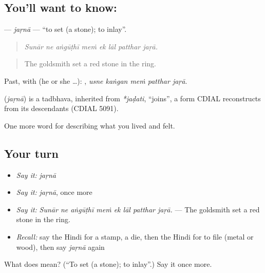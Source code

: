 \subsection*{You'll want to know: }
\textbf{} — \emph{jaṛnā} — \textquotedblleft{}to set (a stone); to inlay\textquotedblright{}.

\begin{quote}
       
\end{quote}

\begin{quote}
\emph{Sunār ne aṅgūṭhī meṁ ek lāl patthar jaṛā.}
\end{quote}

\begin{quote}
The goldsmith set a red stone in the ring.
\end{quote}

Past, with  (he or she …):     , \emph{usne kaṅgan meṁ patthar jaṛā}.

\begin{cousinweb}
\textbf{} (\emph{jaṛnā}) is a tadbhava, inherited from \emph{*jaḍati}, \textquotedblleft{}joins\textquotedblright{}, a form CDIAL reconstructs from its descendants (CDIAL 5091).
\end{cousinweb}

\begin{grammarlens}[title={What you've built}]
One more word for describing what you lived and felt.
\end{grammarlens}

\subsection*{Your turn}
\begin{itemize}
\raggedright
  \item \emph{Say it:} \emph{jaṛnā}
  \item \emph{Say it:} \emph{jaṛnā}, once more
  \item \emph{Say it:} \emph{Sunār ne aṅgūṭhī meṁ ek lāl patthar jaṛā.} — The goldsmith set a red stone in the ring.
  \item \emph{Recall:} say the Hindi for a stamp, a die, then the Hindi for to file (metal or wood), then say \emph{jaṛnā} again
\end{itemize}

\begin{tcolorbox}[breakable,colback=teal!4,colframe=teal!35!black,title={Before you move on}]
What does  mean? (\textquotedblleft{}To set (a stone); to inlay\textquotedblright{}.) Say it once more.
\end{tcolorbox}
